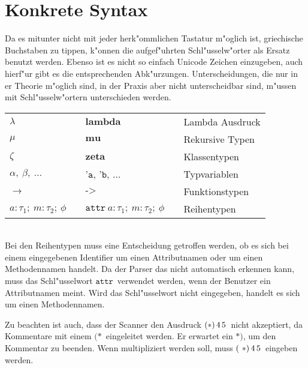 \section{Konkrete Syntax}
Da es mitunter nicht mit jeder herk"ommlichen Tastatur m"oglich ist, griechische Buchstaben zu tippen,
k"onnen die aufgef"uhrten Schl"usselw"orter als Ersatz benutzt werden. Ebenso ist es nicht so einfach
Unicode Zeichen einzugeben, auch hierf"ur gibt es die entsprechenden Abk"urzungen. Unterscheidungen,
die nur in er Theorie m"oglich sind, in der Praxis aber nicht unterscheidbar sind, m"ussen mit
Schl"usselw"ortern unterschieden werden.\\[5mm]
\begin{tabular}{lll}
  \mbox{$\lambda$}                            & $\textbf{lambda}$                        & Lambda Ausdruck\\
  \mbox{$\mu$}                                & $\textbf{mu}$                            & Rekursive Typen\\
  \mbox{$\zeta$}                              & $\textbf{zeta}$                          & Klassentypen\\
  \mbox{$\alpha,\ \beta,\ \ldots$}            & $\texttt{'a}$, $\texttt{'b}$, $\ldots$   & Typvariablen\\
  \mbox{$\to$}                                & $\texttt{->}$                            & Funktionstypen\\
  \mbox{$a: \tau_1;\ m: \tau_2;\ \phi \quad$} & $\texttt{attr}\ a: \tau_1;\ m: \tau_2;\ \phi \quad$
                                                                                         & Reihentypen\\
\end{tabular}\\[5mm]
Bei den Reihentypen muss eine Entscheidung getroffen werden, ob es sich bei einem eingegebenen Identifier
um einen Attributnamen oder um einen Methodennamen handelt. Da der Parser das nicht automatisch erkennen
kann, muss das Schl"usselwort \glqq$\texttt{attr}$\grqq\ verwendet werden, wenn der Benutzer ein 
Attributnamen meint. Wird das Schl"usselwort nicht eingegeben, handelt es sich um einen Methodennamen.

Zu beachten ist auch, dass der Scanner den Ausdruck \glqq$(*)\,4\,5$\grqq\ nicht akzeptiert,
da Kommentare mit einem \glqq$(*$\grqq\ eingeleitet werden. Er erwartet ein \glqq$*)$\grqq,
um den Kommentar zu beenden. Wenn multipliziert werden soll, muss \glqq$(\ *)\,4\,5$\grqq\ 
eingeben werden.


